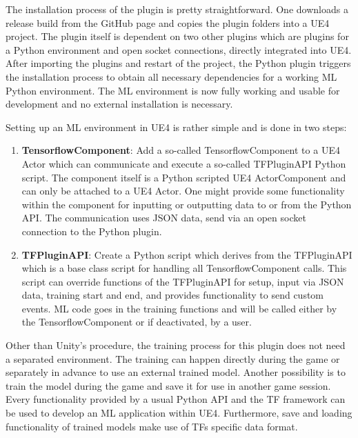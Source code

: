 \documentclass[MGS,Master,english]{twbook}%
\begin{document}
The installation process of the plugin is pretty straightforward. One downloads a release build from the GitHub page and copies the plugin folders into a \ac{UE4} project. The plugin itself is dependent on two other plugins which are plugins for a Python environment and open socket connections, directly integrated into UE4. After importing the plugins and restart of the project, the Python plugin triggers the installation process to obtain all necessary dependencies for a working ML Python environment. The ML environment is now fully working and usable for development and no external installation is necessary.

Setting up an ML environment in UE4 is rather simple and is done in two steps:
\begin{enumerate}
	\item \textbf{TensorflowComponent}: Add a so-called TensorflowComponent to a UE4 Actor which can communicate and execute a so-called TFPluginAPI Python script. The component itself is a Python scripted UE4 ActorComponent and can only be attached to a UE4 Actor. One might provide some functionality within the component for inputting or outputting data to or from the Python API. The communication uses JSON data, send via an open socket connection to the Python plugin.
	\item \textbf{TFPluginAPI}: Create a Python script which derives from the TFPluginAPI which is a base class script for handling all TensorflowComponent calls. This script can override functions of the TFPluginAPI for setup, input via JSON data, training start and end, and provides functionality to send custom events. ML code goes in the training functions and will be called either by the TensorflowComponent or if deactivated, by a user.
\end{enumerate}

Other than Unity’s procedure, the training process for this plugin does not need a separated environment. The training can happen directly during the game or separately in advance to use an external trained model. Another possibility is to train the model during the game and save it for use in another game session. Every functionality provided by a usual Python API and the \ac{TF} framework can be used to develop an ML application within UE4. Furthermore, save and loading functionality of trained models make use of \acp{TF} specific data format.
\end{document}
